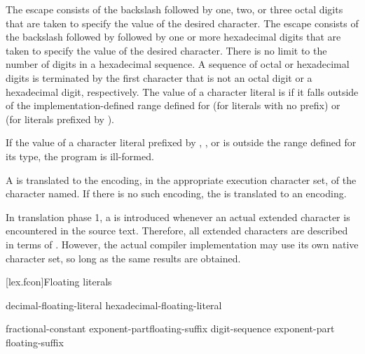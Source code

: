 \pnum
The escape
%
 consists of the backslash followed by one,
two, or three octal digits that are taken to specify the value of the
desired character. The escape
%
consists of the backslash followed by  followed by one or more
hexadecimal digits that are taken to specify the value of the desired
character. There is no limit to the number of digits in a hexadecimal
sequence. A sequence of octal or hexadecimal digits is terminated by the
first character that is not an octal digit or a hexadecimal digit,
respectively.
%
The value of a character literal is  if it falls outside of the implementation-defined range defined for
 (for literals with no prefix) or
 (for literals prefixed by ).
\begin{note}
If the value of a character literal prefixed by
, , or 
is outside the range defined for its type,
the program is ill-formed.
\end{note}

\pnum
A  is translated to the encoding, in the appropriate
execution character set, of the character named. If there is no such
encoding, the  is translated to an
 encoding.
\begin{note} In translation phase 1, a  is introduced whenever an
actual extended
character is encountered in the source text. Therefore, all extended
characters are described in terms of . However,
the actual compiler implementation may use its own native character set,
so long as the same results are obtained. \end{note}

[lex.fcon]{Floating literals}

%
\begin{bnf}
\br
    decimal-floating-literal\br
    hexadecimal-floating-literal
\end{bnf}

\begin{bnf}
\br
    fractional-constant exponent-part\opt floating-suffix\opt\br
    digit-sequence exponent-part floating-suffix\opt
\end{bnf}

